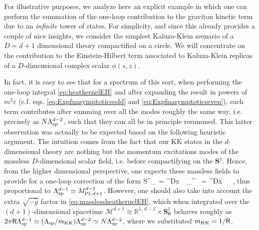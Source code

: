 For illustrative purposes, we analyze here an explicit example in which one can perform the summation of the one-loop contribution to the graviton kinetic term due to an \emph{infinite} tower of states. For simplicity, and since this already provides a couple of nice insights, we consider the simplest Kaluza-Klein scenario of a $D=d+1$ dimensional theory compactified on a circle. We will concentrate on the contribution to the Einstein-Hilbert term associated to Kaluza-Klein replicas of a $D$-dimensional complex scalar $\phi(s, z)$.

In fact, it is easy to see that for a spectrum of this sort, when performing the one-loop integral \eqref{eq:heatkernelEH} and after expanding the result in powers of $m^2\varepsilon$ (c.f. eqs. \eqref{eq:Expfnasymptoticsodd} and \eqref{eq:Expfnasymptoticseven}), each term contributes after summing over all the modes roughly the same way, i.e. precisely as $N \Lambda_{\text{sp}}^{d-2}$, such that they can all be in principle resummed. This latter observation was actually to be expected based on the following heuristic argument. The intuition comes from the fact that our KK states in the $d$-dimensional theory are nothing but the momentum excitations modes of the massless $D$-dimensional scalar field, i.e. before compactifying on the $\mathbf{S}^1$. Hence, from the higher dimensional perspective, one expects these massless fields to provide for a one-loop correction of the form 
%
\beq\label{eq:masslessheatkernelEH}
S^{}_{} = \int \dd^{D}x\, \,  \int_{\varepsilon}^{\infty} \dd \tau\,  =  \int \dd^{D}x\, \, \, ,
\eeq
%
thus proportional to $\Lambda_{\text{sp}}^{d-1} \simeq M_{\text{Pl};\, d+1}^{d-1}$. However, one should also take into account the extra $\sqrt{-\hat g}$ factor in \eqref{eq:masslessheatkernelEH}, which when integrated over the $(d+1)$-dimensional spacetime $\mathcal{M}^{d+1} \cong \mathbb{R}^{1,\, d-1} \times \mathbf{S}^1_{\mathsf{R}}$ behaves roughly as $2\pi \mathsf{R} \Lambda_{\text{sp}}^{d-1} \simeq (\Lambda_{\text{sp}}/m_{\rm KK}) \Lambda_{\text{sp}}^{d-2} \simeq N \Lambda_{\text{sp}}^{d-2}$, where we substituted $m_{\rm KK}=1/\mathsf{R}$. %

